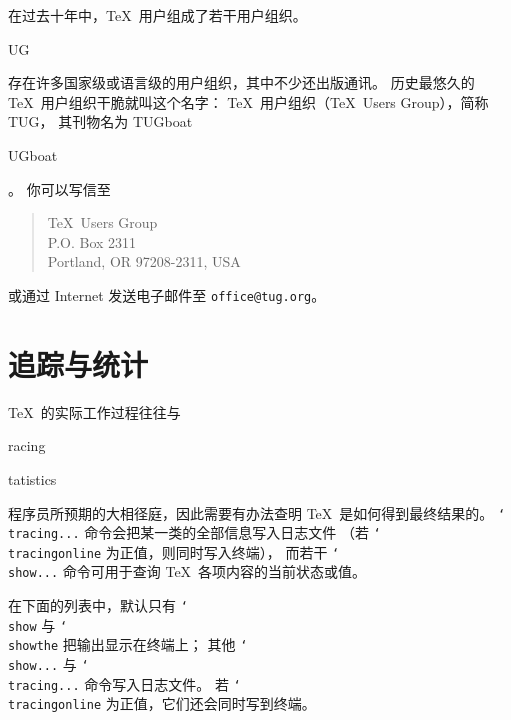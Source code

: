 \documentclass[a4paper]{rapport3}
\def\nl{\protect\\}\def\n#1{{\tt #1}}\def\cs#1{{\tt\char`\\#1}}\let\csc\cs
\newenvironment{disp}{\begin{quotation}}{\end{quotation}}
\def\term#1\par{\index{#1}}
\begin{document}
在过去十年中，\TeX\ 用户组成了若干用户组织。
\term TUG\par
存在许多国家级或语言级的用户组织，其中不少还出版通讯。
历史最悠久的 \TeX\ 用户组织干脆就叫这个名字：
\TeX\ 用户组织（\TeX\ Users Group），简称 TUG，
其刊物名为 {\italic TUGboat}\term TUGboat\par。
你可以写信至
\begin{disp} \TeX\ Users Group\nl P.O. Box 2311\nl
     Portland, OR 97208-2311, USA
\end{disp}
或通过 Internet 发送电子邮件至 \n{office@tug.org}。


\endofchapter
\chapter{追踪与统计}\label{trace}

\TeX\ 的实际工作过程往往与
\term tracing\par\term statistics\par
程序员所预期的大相径庭，因此需要有办法查明 \TeX\ 是如何得到最终结果的。
\cs{tracing...} 命令会把某一类的全部信息写入日志文件
（若 \cs{tracingonline} 为正值，则同时写入终端），
而若干 \cs{show...} 命令可用于查询 \TeX\ 各项内容的当前状态或值。

在下面的列表中，默认只有 \cs{show} 与 \cs{showthe} 把输出显示在终端上；
其他 \cs{show...} 与 \cs{tracing...} 命令写入日志文件。
若 \cs{tracingonline} 为正值，它们还会同时写到终端。
\end{document}
